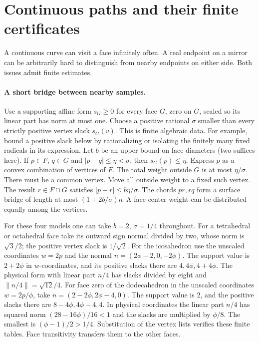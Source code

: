 \section{Continuous paths and their finite certificates}\label{sec:continuity}
A continuous curve can visit a face infinitely often. A real endpoint on a mirror can be arbitrarily hard to distinguish from nearby endpoints on either side. Both issues admit finite estimates.

\paragraph{A short bridge between nearby samples.}
Use a supporting affine form $s_G\ge0$ for every face $G$, zero on $G$, scaled so its linear part has norm at most one. Choose a positive rational $\sigma$ smaller than every strictly positive vertex slack $s_G(v)$. This is finite algebraic data. For example, bound a positive slack below by rationalizing or isolating the finitely many fixed radicals in its expression. Let $b$ be an upper bound on face diameters (two suffices here). If $p\in F$, $q\in G$ and $|p-q|\le\eta<\sigma$, then $s_G(p)\le\eta$. Express $p$ as a convex combination of vertices of $F$. The total weight outside $G$ is at most $\eta/\sigma$. There must be a common vertex. Move all outside weight to a fixed such vertex. The result $r\in F\cap G$ satisfies $|p-r|\le b\eta/\sigma$. The chords $pr,rq$ form a surface bridge of length at most $(1+2b/\sigma)\eta$. A face-center weight can be distributed equally among the vertices.

For these four models one can take $b=2$, $\sigma=1/4$ throughout. For a tetrahedral or octahedral face take its outward sign normal divided by two, whose norm is $\sqrt3/2$; the positive vertex slack is $1/\sqrt2$. For the icosahedron use the unscaled coordinates $w=2p$ and the normal $n=(2\phi-2,0,-2\phi)$. The support value is $2+2\phi$ in $w$-coordinates, and its positive slacks there are $4,4\phi,4+4\phi$. The physical form with linear part $n/4$ has slacks divided by eight and $\|n/4\|=\sqrt{12}/4$. For face zero of the dodecahedron in the unscaled coordinates $w=2p/\phi$, take $n=(2-2\phi,2\phi-4,0)$. The support value is $2$, and the positive slacks there are $8-4\phi,4\phi-4,4$. In physical coordinates the linear part $n/4$ has squared norm $(28-16\phi)/16<1$ and the slacks are multiplied by $\phi/8$. The smallest is $(\phi-1)/2>1/4$. Substitution of the vertex lists verifies these finite tables. Face transitivity transfers them to the other faces.

